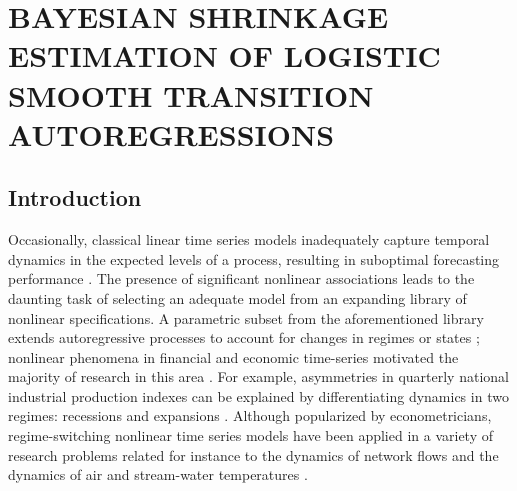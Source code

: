 \chapter{BAYESIAN SHRINKAGE ESTIMATION OF LOGISTIC SMOOTH TRANSITION AUTOREGRESSIONS}
\label{chap:temp}

\section{Introduction}
Occasionally, classical linear time series models inadequately capture temporal dynamics in the expected levels of a process, resulting in suboptimal forecasting performance \citep{Lee1993}. The presence of significant nonlinear associations leads to the daunting task of selecting an adequate model from an expanding library of nonlinear specifications. A parametric subset from the aforementioned library extends autoregressive processes to account for changes in regimes or states \citep{Priestley1988}; nonlinear phenomena in financial and economic time-series motivated the majority of research in this area \citep{Terasvirta2010,Zivot2006,Franses2000}. For example, asymmetries in quarterly national industrial production indexes can be explained by differentiating dynamics in two regimes: recessions and expansions \citep{Terasvirta1992}. Although popularized by econometricians, regime-switching nonlinear time series models have been applied in a variety of research problems related for instance to the dynamics of network flows \citep{Kamarianakis2010} and the dynamics of air \citep{Battaglia2012} and stream-water temperatures \citep{Kamarianakis2016}. 

